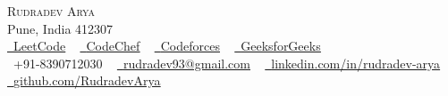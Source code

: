 \documentclass[letterpaper,11pt]{article}
\begin{document}

\begin{center}
    {\Huge \scshape Rudradev Arya} \\ \vspace{1pt}
    Pune, India 412307 \\ \vspace{1pt}
    \small 
    \href{https://leetcode.com/your_username/}{\raisebox{-0.2\height}\faCode\ \underline{LeetCode}} ~
    \href{https://www.codechef.com/users/your_username}{\raisebox{-0.2\height}\faCode\ \underline{CodeChef}} ~
    \href{https://codeforces.com/profile/your_username}{\raisebox{-0.2\height}\faCode\ \underline{Codeforces}} ~
    \href{https://auth.geeksforgeeks.org/user/your_username}{\raisebox{-0.2\height}\faCode\ \underline{GeeksforGeeks}} 
    \\ \vspace{1pt}
    \raisebox{-0.1\height}\faPhone\ +91-8390712030 ~ \href{mailto:rudradev93@gmail.com}{\raisebox{-0.2\height}\faEnvelope\  \underline{rudradev93@gmail.com}} ~ 
    \href{https://linkedin.com/in/rudradev-arya}{\raisebox{-0.2\height}\faLinkedin\ \underline{linkedin.com/in/rudradev-arya}}  ~
    \href{https://github.com/RudradevArya}{\raisebox{-0.2\height}\faGithub\ \underline{github.com/RudradevArya}}
    \vspace{-8pt}
\end{center}
\end{document}
